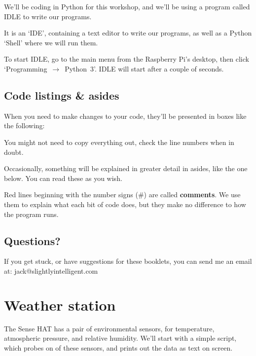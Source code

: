 \documentclass[a4paper, twocolumn, twoside, 12pt]{article}
\newenvironment{aside}
		{
		\begin{mdframed}[
			style=0,%
			leftline=false,
			rightline=false,
			innerbottommargin=2pt,
			innerleftmargin=12pt,
			innerrightmargin=0pt,
			linewidth=0.75pt,
			skipabove=6pt,
			skipbelow=6pt
			]
				\small
				\color{JungleGreen}
				\setlength{\parskip}{2pt}
				\vspace{2pt} %
		}
		{
		\end{mdframed}
		}
\begin{document}
	We'll be coding in Python for this workshop, and we'll be using a program called IDLE to write our programs.
	
	It is an `IDE', containing a text editor to write our programs, as well as a Python `Shell' where we will run them.
	
	To start IDLE\label{IDLE}, go to the main menu from the Raspberry Pi's desktop, then click \mbox{`Programming $\rightarrow$ Python 3'}. IDLE will start after a couple of seconds.
	
	\subsection*{Code listings \& asides}
	
		When you need to make changes to your code, they'll be presented in boxes like the following:

		
	
		You might not need to copy everything out, check the line numbers when in doubt.
	
		Occasionally, something will be explained in greater detail in asides, like the one below. You can read these as you wish.
	
		\begin{aside}
			Red lines beginning with the number signs (\#) are called \textbf{comments}.
			We use them to explain what each bit of code does, but they make no difference to how the program runs.
		\end{aside}
		
	\subsection*{Questions?}
	
		If you get stuck, or have suggestions for these booklets, you can send me an email at:
		\newline \color{WildStrawberry}jack@slightlyintelligent.com\color{Black}\label{email}
	
	\section{Weather station}
	
		The Sense HAT has a pair of environmental sensors, for temperature, atmospheric pressure, and relative humidity.
		We'll start with a simple script, which probes on of these sensors, and prints out the data as text on screen.
		
\end{document}
